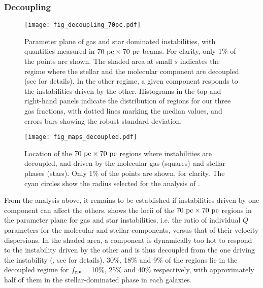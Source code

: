 \documentclass[useAMS,usenatbib]{mnras}
\newcommand{\fgas}{\ensuremath{f_{\rm gas}}\xspace}
\begin{document}
\subsubsection{Decoupling}
\label{sec:decoupling}

\begin{figure}
\centering
\texttt{[image: fig\_decoupling\_70pc.pdf]}
\caption{Parameter plane of gas and star dominated instabilities, with quantities measured in $70 \mathrm{~pc} \times 70 \mathrm{~pc}$ beams. For clarity, only 1\% of the points are shown. The shaded area at small $s$ indicates the regime where the stellar and the molecular component are decoupled (see \citealt{Romeo2013} for details). In the other regime, a given component responds to the instabilities driven by the other. Histograms in the top and right-hand panels indicate the distribution of regions for our three gas fractions, with dotted lines marking the median values, and errors bars showing the robust standard deviation.}
\label{fig:decoupling}
\end{figure}

\begin{figure*}
\centering
\texttt{[image: fig\_maps\_decoupled.pdf]}
\caption{Location of the $70\mathrm{~pc} \times 70\mathrm{~pc}$ regions where instabilities are decoupled, and driven by the molecular gas (squares) and stellar phases (stars). Only 1\% of the points are shown, for clarity. The cyan circles show the radius selected for the analysis of .}
\label{fig:maps_decoupled}
\end{figure*}

From the analysis above, it remains to be established if instabilities driven by one component can affect the others.  shows the locii of the $70 \mathrm{~pc} \times 70 \mathrm{~pc}$ regions in the parameter plane for gas and star instabilities, i.e. the ratio of individual $Q$ parameters for the molecular and stellar components, versus that of their velocity dispersions. In the shaded area, a component is dynamically too hot to respond to the instability driven by the other and is thus decoupled from the one driving the instability (\citealt{Bertin1988, Romeo2011}, see \citealt{Romeo2013} for details). 30\%, 18\% and 9\% of the regions lie in the decoupled regime for \fgas = 10\%, 25\% and 40\% respectively, with approximately half of them in the stellar-dominated phase in each galaxies. 
\end{document}
